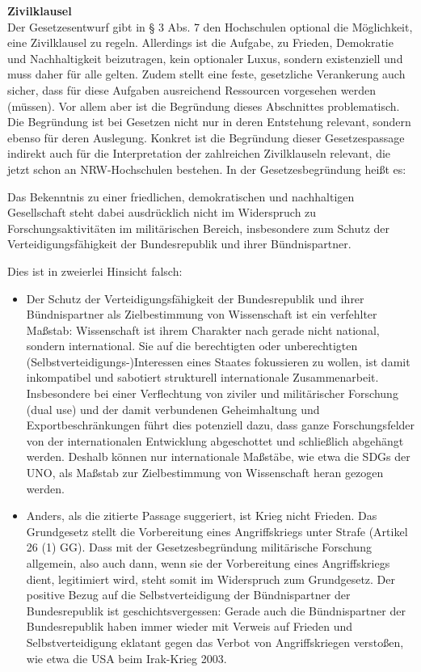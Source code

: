 \documentclass[DIV=calc]{scrartcl}
\let\oldgrqq=\grqq
\def\grqq{\oldgrqq\xspace}
\begin{document}
\textbf{Zivilklausel}\\
Der Gesetzesentwurf gibt in § 3 Abs. 7 den Hochschulen optional die Möglichkeit, eine Zivilklausel zu regeln. Allerdings ist die Aufgabe, zu Frieden, Demokratie und Nachhaltigkeit beizutragen, kein optionaler Luxus, sondern existenziell und muss daher für alle gelten. Zudem stellt eine feste, gesetzliche Verankerung auch sicher, dass für diese Aufgaben ausreichend Ressourcen vorgesehen werden (müssen).
Vor allem aber ist die Begründung dieses Abschnittes problematisch. Die Begründung ist bei Gesetzen nicht nur in deren Entstehung relevant, sondern ebenso für deren Auslegung. Konkret ist die Begründung dieser Gesetzespassage indirekt auch für die Interpretation der zahlreichen Zivilklauseln relevant, die jetzt schon an NRW-Hochschulen bestehen.
In der Gesetzesbegründung heißt es: 

\glqq Das Bekenntnis zu einer friedlichen, demokratischen und nachhaltigen Gesellschaft steht dabei ausdrücklich nicht im Widerspruch zu Forschungsaktivitäten im militärischen Bereich, insbesondere zum Schutz der Verteidigungsfähigkeit der Bundesrepublik und ihrer Bündnispartner.\grqq{} 

Dies ist in zweierlei Hinsicht falsch:
\begin{itemize}
    \item Der \glqq Schutz der Verteidigungsfähigkeit der Bundesrepublik und ihrer Bündnispartner\grqq{} als Zielbestimmung von Wissenschaft ist ein verfehlter Maßstab: Wissenschaft ist ihrem Charakter nach gerade nicht national, sondern international. Sie auf die berechtigten oder unberechtigten (Selbstverteidigungs-)Interessen eines Staates fokussieren zu wollen, ist damit inkompatibel und sabotiert strukturell internationale Zusammenarbeit. Insbesondere bei einer Verflechtung von ziviler und militärischer Forschung (dual use) und der damit verbundenen Geheimhaltung und Exportbeschränkungen führt dies potenziell dazu, dass ganze Forschungsfelder von der internationalen Entwicklung abgeschottet und schließlich abgehängt werden. Deshalb können nur internationale Maßstäbe, wie etwa die SDGs der UNO, als Maßstab zur Zielbestimmung von Wissenschaft heran gezogen werden.
    \item Anders, als die zitierte Passage suggeriert, ist Krieg nicht Frieden. Das Grundgesetz stellt die Vorbereitung eines Angriffskriegs unter Strafe (Artikel 26 (1) GG). Dass mit der Gesetzesbegründung militärische Forschung allgemein, also auch dann, wenn sie der Vorbereitung eines Angriffskriegs dient, legitimiert wird, steht somit im Widerspruch zum Grundgesetz. Der positive Bezug auf die Selbstverteidigung der Bündnispartner der Bundesrepublik ist geschichtsvergessen: Gerade auch die Bündnispartner der Bundesrepublik haben immer wieder mit Verweis auf Frieden und Selbstverteidigung eklatant gegen das Verbot von Angriffskriegen verstoßen, wie etwa die USA beim Irak-Krieg 2003.
\end{itemize}
\end{document}
